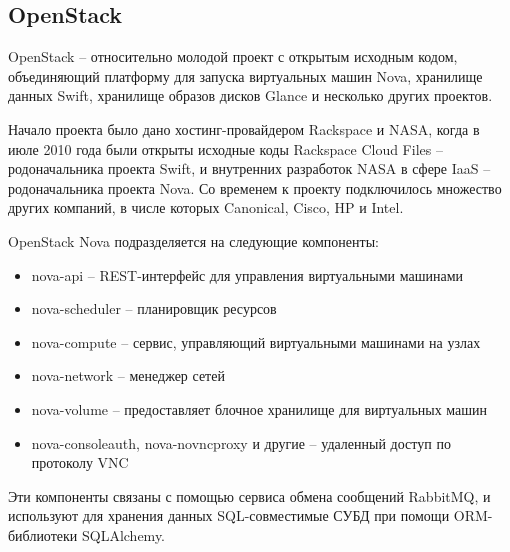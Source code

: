 %
%
%
%

\subsection{OpenStack}
OpenStack -- относительно молодой проект с открытым исходным кодом, 
объединяющий платформу для запуска виртуальных машин Nova, хранилище 
данных Swift, хранилище образов дисков Glance и несколько других проектов.
\cite{vonLaszewski:2012:CMC:2353730.2353779}

Начало проекта было дано хостинг-провайдером Rackspace и NASA, когда в июле 2010 года
были открыты исходные коды Rackspace Cloud Files -- родоначальника проекта Swift, 
и внутренних разработок NASA в сфере IaaS -- родоначальника проекта Nova.
Со временем к проекту подключилось множество других компаний, в числе которых
Canonical, Cisco, HP и Intel.

OpenStack Nova подразделяется на следующие компоненты:
\begin{itemize}
    \item nova-api -- REST-интерфейс для управления виртуальными машинами
    \item nova-scheduler -- планировщик ресурсов
    \item nova-compute -- сервис, управляющий виртуальными машинами на узлах
    \item nova-network -- менеджер сетей
    \item nova-volume -- предоставляет блочное хранилище для виртуальных машин
    \item nova-consoleauth, nova-novncproxy и другие -- удаленный доступ по протоколу VNC
\end{itemize}
Эти компоненты связаны с помощью сервиса обмена сообщений RabbitMQ, и используют
для хранения данных SQL-совместимые СУБД при помощи ORM-библиотеки SQLAlchemy.

